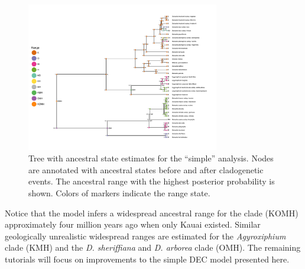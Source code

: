 \begin{figure}[!h]
\centering
\includegraphics[width=0.75\textwidth]{figures/fig_simple_RevGadgets_ase.pdf}
\caption{Tree with ancestral state estimates for the ``simple'' analysis. Nodes are annotated with ancestral states before and after cladogenetic events. The ancestral range with the highest posterior probability is shown. Colors of markers indicate the range state.}
\label{fig:simple_RevGadgets_ase}
\end{figure}

Notice that the model infers a widespread ancestral range for the clade (KOMH) approximately four million years ago when only Kauai existed.
Similar geologically unrealistic widespread ranges are estimated for the {\it Agyroxiphium} clade (KMH) and the {\it D. sheriffiana} and {\it D. arborea} clade (OMH).
The remaining tutorials will focus on improvements to the simple DEC model presented here.

\newpage
